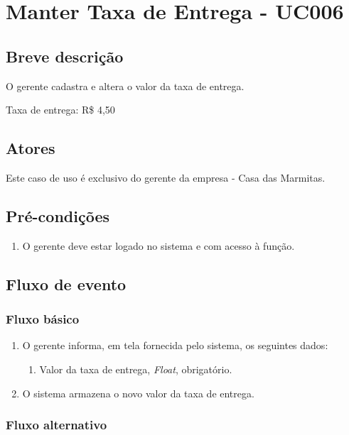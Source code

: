 \chapter{Manter Taxa de Entrega - UC006} \label{uc006}

\section{Breve descrição}

O gerente cadastra e altera o valor da taxa de entrega.

Taxa de entrega: R\$ 4,50

\section{Atores}

Este caso de uso é exclusivo do gerente da empresa - Casa das Marmitas.

\section{Pré-condições}

\begin{enumerate}
	\item O gerente deve estar logado no sistema e com acesso à função.
\end{enumerate}

\section{Fluxo de evento}

\subsection{Fluxo básico}

\begin{enumerate}
	\item O gerente informa, em tela fornecida pelo sistema, os seguintes dados:
	\begin{enumerate}
		\item Valor da taxa de entrega, \emph{Float}, obrigatório.
	\end{enumerate}
	\item O sistema armazena o novo valor da taxa de entrega.
\end{enumerate}

\subsection{Fluxo alternativo}

